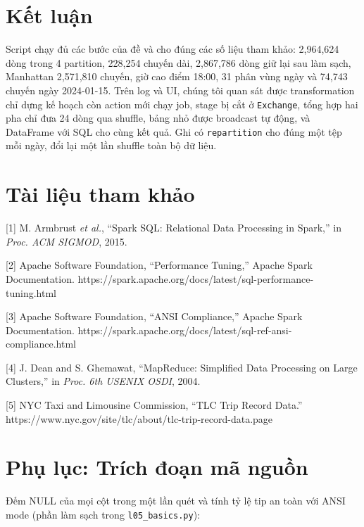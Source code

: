 \documentclass[
  12pt,
  a4paper,
]{article}
\begin{document}
\section{Kết luận}\label{sec:l05-conclusion}

Script chạy đủ các bước của đề và cho đúng các số liệu tham khảo:
2,964,624 dòng trong 4 partition, 228,254 chuyến dài, 2,867,786 dòng giữ
lại sau làm sạch, Manhattan 2,571,810 chuyến, giờ cao điểm 18:00, 31
phân vùng ngày và 74,743 chuyến ngày 2024-01-15. Trên log và UI, chúng
tôi quan sát được transformation chỉ dựng kế hoạch còn action mới chạy
job, stage bị cắt ở \texttt{Exchange}, tổng hợp hai pha chỉ đưa 24 dòng
qua shuffle, bảng nhỏ được broadcast tự động, và DataFrame với SQL cho
cùng kết quả. Ghi có \texttt{repartition} cho đúng một tệp mỗi ngày, đổi
lại một lần shuffle toàn bộ dữ liệu.

\section*{Tài liệu tham khảo}\label{tuxe0i-liux1ec7u-tham-khux1ea3o}

{[}1{]} M. Armbrust \emph{et al.}, ``Spark SQL: Relational Data
Processing in Spark,'' in \emph{Proc. ACM SIGMOD}, 2015.

{[}2{]} Apache Software Foundation, ``Performance Tuning,'' Apache Spark
Documentation.
https://spark.apache.org/docs/latest/sql-performance-tuning.html

{[}3{]} Apache Software Foundation, ``ANSI Compliance,'' Apache Spark
Documentation.
https://spark.apache.org/docs/latest/sql-ref-ansi-compliance.html

{[}4{]} J. Dean and S. Ghemawat, ``MapReduce: Simplified Data Processing
on Large Clusters,'' in \emph{Proc. 6th USENIX OSDI}, 2004.

{[}5{]} NYC Taxi and Limousine Commission, ``TLC Trip Record Data.''
https://www.nyc.gov/site/tlc/about/tlc-trip-record-data.page

\section*{Phụ lục: Trích đoạn mã
nguồn}\label{phux1ee5-lux1ee5c-truxedch-ux111oux1ea1n-muxe3-nguux1ed3n}

Đếm NULL của mọi cột trong một lần quét và tính tỷ lệ tip an toàn với
ANSI mode (phần làm sạch trong \texttt{l05\_basics.py}):
\end{document}
